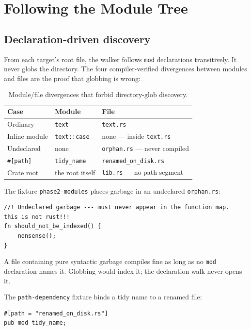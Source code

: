 \documentclass[11pt,a4paper,oneside]{report}
\begin{document}
\chapter{Following the Module Tree}
\label{ch:modules}

\section{Declaration-driven discovery}

From each target's root file, the walker follows \texttt{mod} declarations
transitively. It never globs the directory. The four compiler-verified
divergences between modules and files are the proof that globbing is wrong:

\begin{table}[ht]
\centering
\begin{tabular}{@{}lll@{}}
\toprule
\textbf{Case} & \textbf{Module} & \textbf{File} \\
\midrule
Ordinary       & \texttt{text}       & \texttt{text.rs} \\
Inline module  & \texttt{text::case} & none --- inside \texttt{text.rs} \\
Undeclared     & none                & \texttt{orphan.rs} --- never compiled \\
\texttt{\#[path]} & \texttt{tidy\_name} & \texttt{renamed\_on\_disk.rs} \\
Crate root     & the root itself     & \texttt{lib.rs} --- no path segment \\
\bottomrule
\end{tabular}
\caption{Module/file divergences that forbid directory-glob discovery.}
\label{tab:mod-file}
\end{table}

The fixture \texttt{phase2-modules} places garbage in an undeclared
\texttt{orphan.rs}:

\begin{lstlisting}
//! Undeclared garbage --- must never appear in the function map.
this is not rust!!!
fn should_not_be_indexed() {
    nonsense();
}
\end{lstlisting}

A file containing pure syntactic garbage compiles fine as long as no
\texttt{mod} declaration names it. Globbing would index it; the declaration
walk never opens it.

The \texttt{path-dependency} fixture binds a tidy name to a renamed file:

\begin{lstlisting}
#[path = "renamed_on_disk.rs"]
pub mod tidy_name;
\end{lstlisting}
\end{document}
